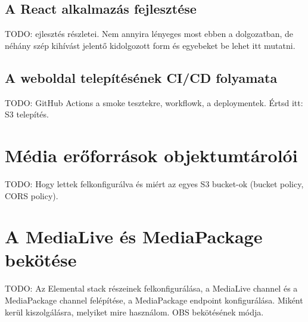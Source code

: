 \subsection{A React alkalmazás fejlesztése}

TODO: ejlesztés részletei. Nem annyira lényeges most ebben a dolgozatban, de néhány szép kihívást jelentő kidolgozott form és egyebeket be lehet itt mutatni.

\subsection{A weboldal telepítésének CI/CD folyamata}

TODO: GitHub Actions a smoke tesztekre, workflowk, a deploymentek. Értsd itt: S3 telepítés.

\section{Média erőforrások objektumtárolói}

TODO: Hogy lettek felkonfigurálva és miért az egyes S3 bucket-ok (bucket policy, CORS policy).

\section{A MediaLive és MediaPackage bekötése}

TODO: Az Elemental stack részeinek felkonfigurálása, a MediaLive channel és a MediaPackage channel felépítése, a MediaPackage endpoint konfigurálása. Miként kerül kiszolgálásra, melyiket mire használom. OBS bekötésének módja.
